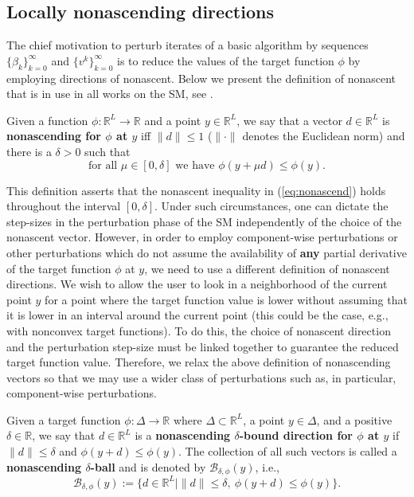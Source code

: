 \documentclass[smallextended]{svjour3}      %
\begin{document}
\subsection{Locally nonascending directions}
The chief motivation to perturb iterates of a basic algorithm by sequences $\{\beta_{k}\}_{k=0}^{\infty}$ and $\{v^{k}\}_{k=0}^{\infty}$ is to reduce the values of the target function $\phi$ by employing directions of nonascent. Below we present the definition of nonascent that is in use in all works on the SM, see \cite[Subsection II.D]{censor2014projectedsubgrad}.
\begin{definition}
	\label{def:nonascend}Given a function $\phi:\mathbb{R}^{L}\rightarrow \mathbb{R}$ and a point $y\in \mathbb{R}^{L}$, we say that a vector $d\in \mathbb{R}^{L}$ is \textbf{nonascending for $\phi$ at $y$} iff $\|d\|\leq1$ ($\|\cdot\|$ denotes the Euclidean norm) and there is a $\delta>0$ such that
	\begin{equation}
	\mbox{for all }\mu\in\left[0,\delta\right]\mbox{ we have }\phi\left(y+\mu d\right)\leq\phi\left(y\right).\label{eq:nonascend}
	\end{equation}
\end{definition}
This definition asserts that the nonascent inequality in (\ref{eq:nonascend}) holds throughout the interval $\left[0,\delta\right].$ Under such circumstances, one can dictate the step-sizes in the perturbation phase of the SM independently of the choice of the nonascent vector. However, in order to employ component-wise perturbations or other perturbations which do not assume the availability of \textbf{any} partial derivative of the target function $\phi$ at $y$, we need to use a different definition of nonascent directions.
We wish to allow the user to look in a neighborhood of the current point $y$ for a point where the target function value is lower without assuming that it is lower in an interval around the current point (this could be the case, e.g., with nonconvex target functions). To do this, the choice of nonascent direction and the perturbation step-size must be linked together to guarantee the reduced target function value. Therefore, we relax the above definition of nonascending vectors so that we may use a wider class of perturbations such as, in particular, component-wise perturbations.
\begin{definition}
	\label{def:nonascent}Given a target function $\phi:\Delta\rightarrow\mathbb{R}$ where $\Delta\subset\mathbb{R}^{L}$, a point $y\in\Delta$, and a positive $\delta\in\mathbb{R}$, we say that $d\in\mathbb{R}^{L}$ is a \textbf{nonascending $\delta$-bound direction for $\phi$ at $y$} if $\|d\|\leq\delta$ and $\phi(y+d)\leq\phi(y)$. The collection of all such vectors is called a \textbf{nonascending $\delta$-ball} and is denoted by $\mathcal{B}_{\delta,\phi}(y)$, i.e.,
	\begin{equation}
	\mathcal{B}_{\delta,\phi}(y):=\{d\in\mathbb{R}^{L}\mid\|d\|\leq\delta,\ \phi(y+d)\leq\phi(y)\}.
	\end{equation}
\end{definition}
\end{document}

